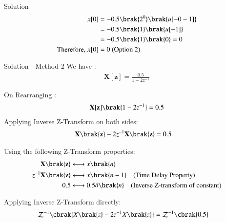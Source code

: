 \documentclass{beamer}
\begin{document}
\begin{frame}{Solution}
    \begin{align}
x[0] &= -0.5\brak{2^{0}}\brak{ u[-0-1]}\\
&= -0.5\brak{1}\brak{ u[-1]}\\
&= -0.5\brak{1}\brak{0} = 0\\
\text{Therefore, } x[0] &= 0  \text{  (Option 2)}
\end{align}
\end{frame}


\begin{frame}{Solution - Method-2}
We have :
\begin{align}
    \mathbf{X[z]} = \frac{0.5}{1 - 2 z ^{-1}}
\end{align}

On Rearranging :
\begin{align}
    \mathbf{X[z]} \brak{1 - 2 z ^{-1}}= 0.5
\end{align}
    Applying Inverse Z-Transform on both sides:
\begin{align}
    \mathbf{X\brak{z}} - 2z^{-1}\mathbf{X\brak{z}} &= 0.5
\end{align}

Using the following Z-Transform properties:
\begin{align}
    \mathbf{X\brak{z}} &\longleftrightarrow x\brak{n} \\
    z^{-1}\mathbf{X\brak{z}} &\longleftrightarrow x\brak{n-1} \quad \text{(Time Delay Property)}\\
    0.5 &\longleftrightarrow 0.5\delta\brak{n} \quad \text{(Inverse Z-transform of constant)}
\end{align}

Applying Inverse Z-Transform directly:
\begin{align}
    \mathcal{Z}^{-1}\cbrak{X\brak{z} - 2z^{-1}X\brak{z}} &= \mathcal{Z}^{-1}\cbrak{0.5}
\end{align}


\end{frame}
\end{document}
